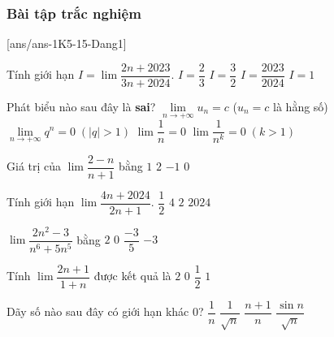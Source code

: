 \subsubsection{Bài tập trắc nghiệm}
[ans/ans-1K5-15-Dang1]
\begin{ex}%
	Tính giới hạn $I=\lim\dfrac{2n+2023}{3n+2024}$. 
	\choice
	{\True $I=\dfrac{2}{3}$}
	{$I=\dfrac{3}{2}$}
	{$I=\dfrac{2023}{2024}$}
	{$I=1$}
\end{ex}
\begin{ex}%
	Phát biểu nào sau đây là \textbf{sai}?
	\choice
	{$\lim \limits_{n \to +\infty}u_n=c$ ($u_n=c$ là hằng số)}
	{\True $\lim \limits_{n \to +\infty}q^n=0 \;(|q|>1)$}
	{$\lim\dfrac{1}{n}=0$}
	{$\lim\dfrac{1}{n^k}=0 \; (k>1)$}
\end{ex}
\begin{ex}%
	Giá trị của $\lim\dfrac{2-n}{n+1}$ bằng
	\choice
	{$1$}
	{$2$}
	{\True $-1$}
	{$0$}
\end{ex}
\begin{ex}%
	Tính giới hạn $\lim\dfrac{4n+2024}{2n+1}$. 
	\choice
	{$\dfrac{1}{2}$}
	{$4$}
	{\True $2$}
	{$2024$}
\end{ex}
\begin{ex}%
	$\lim\dfrac{2n^2-3}{n^6+5n^5}$ bằng 
	\choice
	{$2$}
	{\True $0$}
	{$\dfrac{-3}{5}$}
	{$-3$}
\end{ex}
\begin{ex}%
	Tính $\lim\dfrac{2n+1}{1+n}$ được kết quả là
	\choice
	{\True $2$}
	{$0$}
	{$\dfrac{1}{2}$}
	{$1$}
\end{ex}

\begin{ex}%
	Dãy số nào sau đây có giới hạn khác $0$?
	\choice
	{$\dfrac{1}{n}$}
	{$\dfrac{1}{\sqrt{n}}$}
	{\True $\dfrac{n+1}{n}$}
	{$\dfrac{\sin n}{\sqrt{n}}$}
\end{ex}

